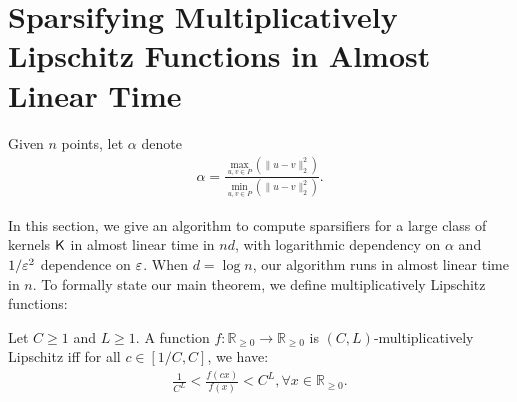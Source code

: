 \section{Sparsifying Multiplicatively Lipschitz Functions in Almost Linear Time}\label{sec:sparsify-lipschitz}


\iffalse
Given $n$ points, let $\kappa$ denote the value of the maximum distance between any pair, divided by the minimum distance, i.e.,
\begin{align*}
    \kappa = \frac{ \max_{u, v \in P} \|u-v\|_2 }{ \min_{u, v \in P} \|u-v\|_2 }.
\end{align*}
Throughout this section, we state our bounds in terms of $\kappa$, since this quantity fits nicely into our proofs. We will soon see how $\kappa$ relates to $\alpha$, where $\alpha$ is defined in the introduction (Section~\ref{sec:intro}) as 
\begin{align*}
\alpha = \frac{\max_{u, v \in P} f(\|u-v\|_2^2)}{\min_{u, v \in P} f(\|u-v\|_2^2)}.
\end{align*}

\paragraph{$\kappa$ vs $\alpha$. }  If $f(x) = 1$ for all $x$, then $\kappa$ can be arbitrarily large, while $\alpha$ is $1$. In this case, sparsifying the $f$ graph is easy, but there may be cases where $\alpha$ is bounded but $\kappa$ is not, where sparsifying $f$ graph could still be hard.
\fi


Given $n$ points, let $\alpha$ denote 
\begin{align*}
\alpha = \frac{\max_{u, v \in P} (\|u-v\|_2^2)}{\min_{u, v \in P} (\|u-v\|_2^2)}.
\end{align*}

In this section, we give an algorithm to compute sparsifiers for a large class of kernels $\mathsf{K}$ in almost linear time in $nd$, with logarithmic dependency on $\alpha$ and $1/\varepsilon^2$ dependence on $\varepsilon$. When $d = \log n$, our algorithm runs in almost linear time in $n$.  
To formally state our main theorem, we define multiplicatively Lipschitz functions:
\begin{definition}\label{def:mult-lip}
Let $C \geq 1$ and $L \geq 1$. A function $f: \mathbb{R}_{\geq 0} \rightarrow \mathbb{R}_{\geq 0}$ is $(C, L)$-multiplicatively Lipschitz iff for all $c \in [1/C, C]$, we have:
  \begin{align*}
  \frac{1}{C^L} < \frac{f(cx)}{f(x)} < C^L, \forall x \in \mathbb{R}_{\geq 0}.
  \end{align*}
\end{definition}

